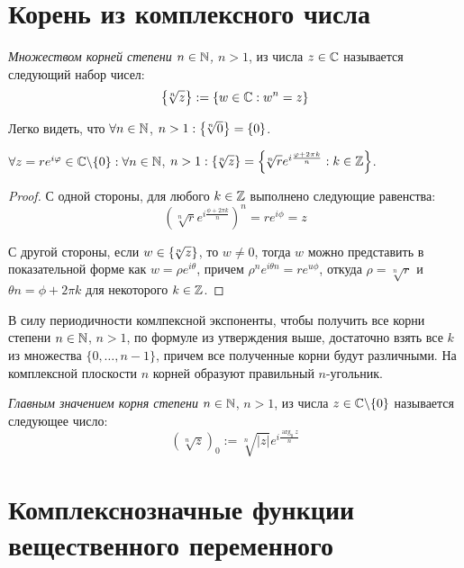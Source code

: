 \section{Корень из комплексного числа}

\begin{definition}
	\textit{Множеством корней степени $n \in \mathbb{N}$, $n > 1$}, из числа $z \in \mathbb{C}$ называется следующий набор чисел:
	\[\left\{\!\sqrt[n]{z}\right\} := \left\{w \in \mathbb{C}: w^n = z\right\}\]
\end{definition}

\begin{note}
	Легко видеть, что $\forall n \in \mathbb{N}$, $n > 1: \left\{\!\sqrt[n]{0}\right\} = \{0\}$.
\end{note}

\begin{proposition}
	$\forall z = re^{i\varphi} \in \mathbb{C} \backslash \{0\}: \forall n \in \mathbb{N}$, $n > 1: \left\{\!\sqrt[n]{z}\right\} = \left\{\!\sqrt[n]{r}e^{i\frac{\varphi + 2\pi k}{n}} : k \in \mathbb{Z}\right\}$.
\end{proposition}

\begin{proof}
	С одной стороны, для любого $k \in \mathbb{Z}$ выполнено следующие равенства:
	\[\left(\!\sqrt[n]{r}e^{i\frac{\phi + 2\pi k}{n}}\right)^n = re^{i\phi} = z\]
	
	С другой стороны, если $w \in \left\{\!\sqrt[n]{z}\right\}$, то $w \ne 0$, тогда $w$ можно представить в показательной форме как $w = \rho e^{i\theta}$, причем $\rho^ne^{i\theta n} = re^{u\phi}$, откуда $\rho = \sqrt[n]{r}$ и $\theta n = \phi + 2\pi k$ для некоторого $k \in \mathbb{Z}$.
\end{proof}

\begin{note}
	В силу периодичности комлпексной экспоненты, чтобы получить все корни степени $n \in \mathbb{N}$, $n > 1$, по формуле из утверждения выше, достаточно взять все $k$ из множества $\{0, \dotsc, n - 1\}$, причем все полученные корни будут различными. На комплексной плоскости $n$ корней образуют правильный $n$-угольник.
\end{note}

\begin{definition}
	\textit{Главным значением корня степени} $n \in \mathbb{N}$, $n > 1$, из числа $z \in \mathbb{C} \backslash \{0\}$ называется следующее число:
	\[\left(\!\sqrt[n]{z}\right)_0 := \sqrt[n]{|z|}e^{i\frac{\arg_0z}n}\]
\end{definition}

\section{Комплекснозначные функции вещественного переменного}

